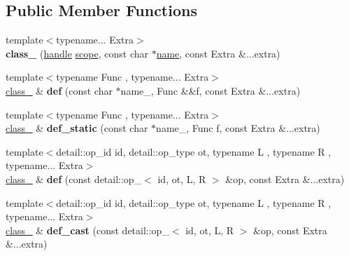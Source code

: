 \subsection*{Public Member Functions}
\begin{DoxyCompactItemize}
\item 
{\footnotesize template$<$typename... Extra$>$ }\\{\bfseries class\+\_\+} (\hyperlink{classhandle}{handle} \hyperlink{structscope}{scope}, const char $\ast$\hyperlink{structname}{name}, const Extra \&...extra)\hypertarget{classclass___a563122227b351316c955987072cd4278}{}\label{classclass___a563122227b351316c955987072cd4278}

\item 
{\footnotesize template$<$typename Func , typename... Extra$>$ }\\\hyperlink{classclass__}{class\+\_\+} \& {\bfseries def} (const char $\ast$name\+\_\+, Func \&\&f, const Extra \&...extra)\hypertarget{classclass___af0d57dd9c94f96b924e21ce33748d164}{}\label{classclass___af0d57dd9c94f96b924e21ce33748d164}

\item 
{\footnotesize template$<$typename Func , typename... Extra$>$ }\\\hyperlink{classclass__}{class\+\_\+} \& {\bfseries def\+\_\+static} (const char $\ast$name\+\_\+, Func f, const Extra \&...extra)\hypertarget{classclass___abd6fe0a6c30bd403d25d1a8bf84b80ae}{}\label{classclass___abd6fe0a6c30bd403d25d1a8bf84b80ae}

\item 
{\footnotesize template$<$detail\+::op\+\_\+id id, detail\+::op\+\_\+type ot, typename L , typename R , typename... Extra$>$ }\\\hyperlink{classclass__}{class\+\_\+} \& {\bfseries def} (const detail\+::op\+\_\+$<$ id, ot, L, R $>$ \&op, const Extra \&...extra)\hypertarget{classclass___ae9b2f5344f72456c528671f9c4978cf4}{}\label{classclass___ae9b2f5344f72456c528671f9c4978cf4}

\item 
{\footnotesize template$<$detail\+::op\+\_\+id id, detail\+::op\+\_\+type ot, typename L , typename R , typename... Extra$>$ }\\\hyperlink{classclass__}{class\+\_\+} \& {\bfseries def\+\_\+cast} (const detail\+::op\+\_\+$<$ id, ot, L, R $>$ \&op, const Extra \&...extra)\hypertarget{classclass___a444f4de6d9ab4de757c6904c5ef6332e}{}\label{classclass___a444f4de6d9ab4de757c6904c5ef6332e}


\end{DoxyCompactItemize}
